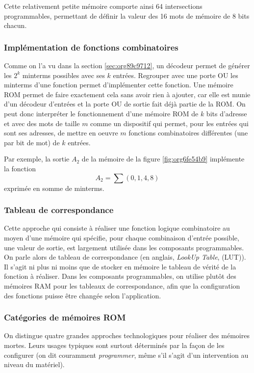 \documentclass[11pt]{article}
\begin{document}
Cette relativement petite mémoire comporte ainsi 64 intersections
programmables, permettant de définir la valeur des 16 mots de mémoire
de 8 bits chacun.

\subsubsection{Implémentation de fonctions combinatoires}
\label{sec:orgd7b730e}

Comme on l'a vu dans la section \ref{sec:org89c9712}, un décodeur permet de
générer les \(2^k\) minterms possibles avec ses \(k\)
entrées. Regrouper avec une porte OU les minterms d'une
fonction permet d'implémenter cette fonction. Une mémoire ROM permet
de faire exactement cela sans avoir rien à ajouter, car elle est munie
d'un décodeur d'entrées et la porte OU de sortie fait déjà partie de
la ROM. On peut donc interpréter le fonctionnement d'une mémoire ROM
de \(k\) bits d'adresse et avec des mots de taille \(m\) comme un
dispositif qui permet, pour les entrées qui sont ses adresses, de
mettre en oeuvre \(m\) fonctions combinatoires différentes (une par
bit de mot) de \(k\) entrées.

Par exemple, la sortie \(A_2\) de la mémoire de la figure
\ref{fig:org6fe54b9} implémente la fonction $$ A_2 = \sum (0,1,4,8) $$
exprimée en somme de minterms.

\subsubsection{Tableau de correspondance}
\label{sec:orgef41618}

Cette approche qui consiste à réaliser une fonction logique
combinatoire au moyen d'une mémoire qui spécifie, pour chaque
combinaison d'entrée possible, une valeur de sortie, est largement
utilisée dans les composants programmables. On parle alors de tableau
de correspondance (en anglais, \emph{LookUp Table}, (LUT)). Il s'agit ni
plus ni moins que de stocker en mémoire le tableau de vérité de la
fonction à réaliser. Dans les composants programmables, on utilise
plutôt des mémoires RAM pour les tableaux de correspondance, afin que
la configuration des fonctions puisse être changée selon
l'application.

\subsubsection{Catégories de mémoires ROM}
\label{sec:org87d8369}

On distingue quatre grandes approches technologiques pour réaliser des
mémoires mortes. Leurs usages typiques sont surtout déterminés par la
façon de les configurer (on dit couramment \emph{programmer}, même s'il
s'agit d'un intervention au niveau du matériel).
\end{document}
